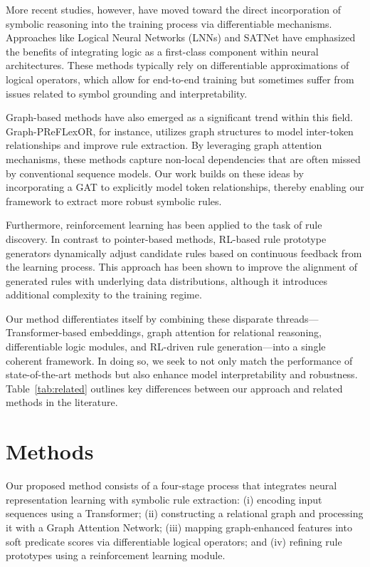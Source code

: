 \documentclass{article}
\begin{document}
More recent studies, however, have moved toward the direct incorporation of symbolic reasoning into the training process via differentiable mechanisms. Approaches like Logical Neural Networks (LNNs) and SATNet have emphasized the benefits of integrating logic as a first-class component within neural architectures. These methods typically rely on differentiable approximations of logical operators, which allow for end-to-end training but sometimes suffer from issues related to symbol grounding and interpretability.

Graph-based methods have also emerged as a significant trend within this field. Graph-PReFLexOR, for instance, utilizes graph structures to model inter-token relationships and improve rule extraction. By leveraging graph attention mechanisms, these methods capture non-local dependencies that are often missed by conventional sequence models. Our work builds on these ideas by incorporating a GAT to explicitly model token relationships, thereby enabling our framework to extract more robust symbolic rules.

Furthermore, reinforcement learning has been applied to the task of rule discovery. In contrast to pointer-based methods, RL-based rule prototype generators dynamically adjust candidate rules based on continuous feedback from the learning process. This approach has been shown to improve the alignment of generated rules with underlying data distributions, although it introduces additional complexity to the training regime. 

Our method differentiates itself by combining these disparate threads—Transformer-based embeddings, graph attention for relational reasoning, differentiable logic modules, and RL-driven rule generation—into a single coherent framework. In doing so, we seek to not only match the performance of state-of-the-art methods but also enhance model interpretability and robustness. Table~\ref{tab:related} outlines key differences between our approach and related methods in the literature.

\section{Methods}
Our proposed method consists of a four-stage process that integrates neural representation learning with symbolic rule extraction: (i) encoding input sequences using a Transformer; (ii) constructing a relational graph and processing it with a Graph Attention Network; (iii) mapping graph-enhanced features into soft predicate scores via differentiable logical operators; and (iv) refining rule prototypes using a reinforcement learning module.
\end{document}
